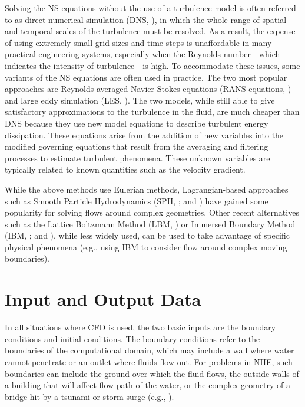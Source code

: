 Solving the NS equations without the use of a turbulence model is often referred to as direct numerical simulation (DNS,  \cite{Orszag1970DNS}), in which the whole range of spatial and temporal scales of the turbulence must be resolved. As a result, the expense of using extremely small grid sizes and time steps is unaffordable in many practical engineering systems, especially when the Reynolds number---which indicates the intensity of turbulence---is high. To accommodate these issues, some variants of the NS equations are often used in practice. The two most popular approaches are Reynolds-averaged Navier-Stokes equations (RANS equations, \cite{Reynolds1895RANS, Chou1945RANS}) and large eddy simulation (LES, \cite{Deardorff1970LES}). The two models, while still able to give satisfactory approximations to the turbulence in the fluid, are much cheaper than DNS because they use new model equations to describe turbulent energy dissipation. These equations arise from the addition of new variables into the modified governing equations that result from the averaging and filtering processes to estimate turbulent phenomena. These unknown variables are typically related to known quantities such as the velocity gradient. 

While the above methods use Eulerian methods, Lagrangian-based approaches such as Smooth Particle Hydrodynamics (SPH,  \cite{Gingold1977SPH, Lucy1977SPH}; and \cite{Lind2020SPH}) have gained some popularity  for solving flows around complex geometries.  Other recent alternatives such as the Lattice Boltzmann Method (LBM,  \cite{Chen1998LBM}) or Immersed Boundary Method (IBM,  \cite{Peskin1972IBM, Peskin1977IBM}; and \cite{Peskin2002IBM}), while less widely used, can be used to take advantage of specific physical phenomena (e.g., using IBM to consider flow around complex moving boundaries).  
 
\section{Input and Output Data}
\label{sec:resp_cfd_water_io}

In all situations where CFD is used, the two basic inputs are the boundary conditions and initial conditions. The boundary conditions refer to the boundaries of the computational domain, which may include a wall where water cannot penetrate or an outlet where fluids flow out. For problems in NHE, such boundaries can include the ground over which the fluid flows, the outside walls of a building that will affect flow path of the water, or the complex geometry of a bridge hit by a tsunami or storm surge (e.g., \cite{giles1990nonreflecting, miquel2018analysis}). 

